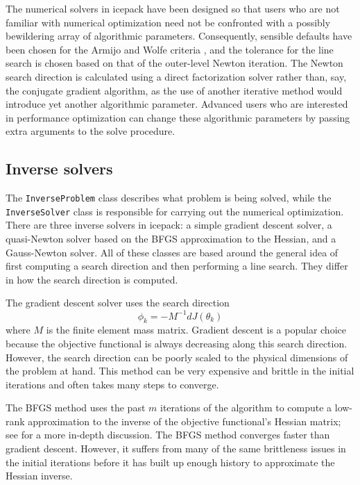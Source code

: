 \documentclass[journal abbreviation, manuscript]{copernicus}
\begin{document}
The numerical solvers in icepack have been designed so that users who are not familiar with numerical optimization need not be confronted with a possibly bewildering array of algorithmic parameters.
Consequently, sensible defaults have been chosen for the Armijo and Wolfe criteria \citep{nocedal2006numerical}, and the tolerance for the line search is chosen based on that of the outer-level Newton iteration.
The Newton search direction is calculated using a direct factorization solver rather than, say, the conjugate gradient algorithm, as the use of another iterative method would introduce yet another algorithmic parameter.
Advanced users who are interested in performance optimization can change these algorithmic parameters by passing extra arguments to the solve procedure.


\subsection{Inverse solvers} \label{sec:numerics-inverse-solvers}

The \texttt{InverseProblem} class describes what problem is being solved, while the \texttt{InverseSolver} class is responsible for carrying out the numerical optimization.
There are three inverse solvers in icepack: a simple gradient descent solver, a quasi-Newton solver based on the BFGS approximation to the Hessian, and a Gauss-Newton solver.
All of these classes are based around the general idea of first computing a search direction and then performing a line search.
They differ in how the search direction is computed.

The gradient descent solver uses the search direction
\begin{equation}
    \phi_k = -M^{-1}dJ(\theta_k)
\end{equation}
where $M$ is the finite element mass matrix.
Gradient descent is a popular choice because the objective functional is always decreasing along this search direction.
However, the search direction can be poorly scaled to the physical dimensions of the problem at hand.
This method can be very expensive and brittle in the initial iterations and often takes many steps to converge.

The BFGS method uses the past $m$ iterations of the algorithm to compute a low-rank approximation to the inverse of the objective functional's Hessian matrix; see \citet{nocedal2006numerical} for a more in-depth discussion.
The BFGS method converges faster than gradient descent.
However, it suffers from many of the same brittleness issues in the initial iterations before it has built up enough history to approximate the Hessian inverse.
\end{document}
